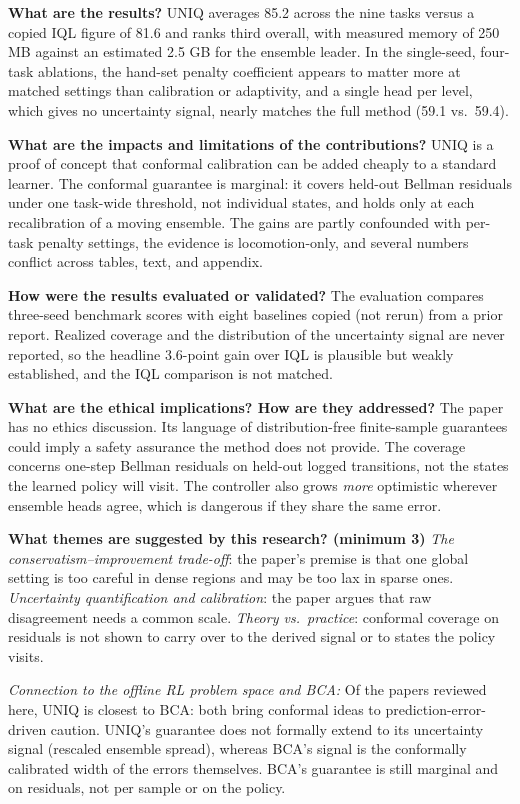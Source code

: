 \documentclass[11pt]{article}
\newcommand{\q}[2]{\item \textbf{#1} #2}
\newcommand{\tiein}[1]{\par\smallskip\noindent\emph{Connection to the offline RL problem space and BCA:} #1\par\medskip}
\begin{document}
\begin{qna}
\q{What are the results?}
UNIQ averages 85.2 across the nine tasks versus a copied IQL figure of 81.6 and ranks third overall, with measured memory of 250 MB against an estimated 2.5 GB for the ensemble leader. In the single-seed, four-task ablations, the hand-set penalty coefficient appears to matter more at matched settings than calibration or adaptivity, and a single head per level, which gives no uncertainty signal, nearly matches the full method (59.1 vs.\ 59.4).

\q{What are the impacts and limitations of the contributions?}
UNIQ is a proof of concept that conformal calibration can be added cheaply to a standard learner. The conformal guarantee is marginal: it covers held-out Bellman residuals under one task-wide threshold, not individual states, and holds only at each recalibration of a moving ensemble. The gains are partly confounded with per-task penalty settings, the evidence is locomotion-only, and several numbers conflict across tables, text, and appendix.

\q{How were the results evaluated or validated?}
The evaluation compares three-seed benchmark scores with eight baselines copied (not rerun) from a prior report. Realized coverage and the distribution of the uncertainty signal are never reported, so the headline 3.6-point gain over IQL is plausible but weakly established, and the IQL comparison is not matched.

\q{What are the ethical implications? How are they addressed?}
The paper has no ethics discussion. Its language of distribution-free finite-sample guarantees could imply a safety assurance the method does not provide. The coverage concerns one-step Bellman residuals on held-out logged transitions, not the states the learned policy will visit. The controller also grows \emph{more} optimistic wherever ensemble heads agree, which is dangerous if they share the same error.

\q{What themes are suggested by this research? (minimum 3)}
\emph{The conservatism--improvement trade-off}: the paper's premise is that one global setting is too careful in dense regions and may be too lax in sparse ones. \emph{Uncertainty quantification and calibration}: the paper argues that raw disagreement needs a common scale. \emph{Theory vs.\ practice}: conformal coverage on residuals is not shown to carry over to the derived signal or to states the policy visits.

\end{qna}
\tiein{Of the papers reviewed here, UNIQ is closest to BCA: both bring conformal ideas to prediction-error-driven caution. UNIQ's guarantee does not formally extend to its uncertainty signal (rescaled ensemble spread), whereas BCA's signal is the conformally calibrated width of the errors themselves. BCA's guarantee is still marginal and on residuals, not per sample or on the policy.}
\end{document}
